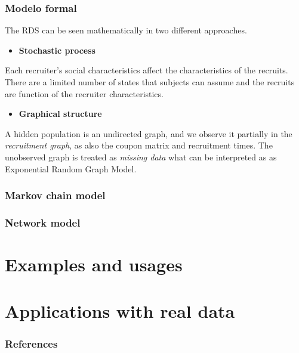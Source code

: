 \documentclass{beamer}
\newcommand{\Space}{\vspace{3ex}}
\begin{document}
\begin{frame}
  
  \frametitle{Modelo formal}

  The RDS can be seen mathematically in two different approaches. 

  \Space

  \begin{itemize}
    \item {\bf Stochastic process} \cite{heckathorn1997}
  \end{itemize}

  Each recruiter's social characteristics affect the characteristics of the
  recruits. There are a limited number of states that subjects can assume and
  the recruits are function of the recruiter characteristics.

  \Space

  \begin{itemize}
    \item {\bf Graphical structure} \cite{crawford2016}
  \end{itemize}

  A hidden population is an undirected graph, and we observe it partially in
  the {\em recruitment graph}, as also the coupon matrix and recruitment
  times. The unobserved graph is treated as {\em missing data} what can be
  interpreted as as Exponential Random Graph Model.  

\end{frame}

\begin{frame}
\frametitle{Markov chain model}



\end{frame}

\begin{frame}
\frametitle{Network model}  

\end{frame}

\section{Examples and usages}

\section{Applications with real data}

\begin{frame}[t, allowframebreaks]
   \frametitle{References}
   
   
 \end{frame}
\end{document}
